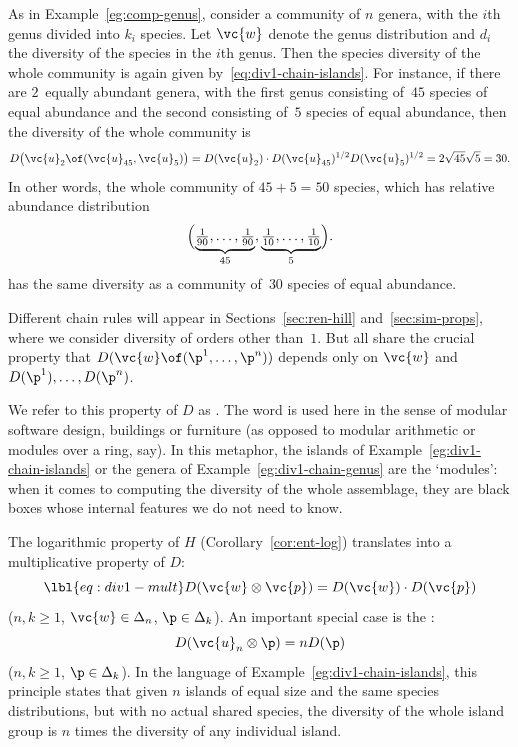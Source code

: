 \begin{example}
% 
As in Example~\ref{eg:comp-genus}, consider a community of $n$ genera, with
the $i$th genus divided into $k_i$ species.  Let $\vc{w}$ denote the genus
distribution and $d_i$ the diversity of the species in the $i$th genus.
Then the species diversity of the whole community is again given
by~\eqref{eq:div1-chain-islands}.  For instance, if there are $2$~equally
abundant genera, with the first genus consisting of~$45$ species of equal
abundance and the second consisting of~$5$ species of equal abundance, then
the diversity of the whole community is
\[
D\bigl(\vc{u}_2 \of (\vc{u}_{45}, \vc{u}_5)\bigr)
=
D(\vc{u}_2) \cdot D(\vc{u}_{45})^{1/2} D(\vc{u}_5)^{1/2}
=
2 \sqrt{45}\sqrt{5} 
=
30.
\]
In other words, the whole community of $45 + 5 = 50$ species, which has
relative abundance distribution
\[
\Bigl(
\underbrace{\tfrac{1}{90}, \ldots, \tfrac{1}{90}}_{45},
\underbrace{\tfrac{1}{10}, \ldots, \tfrac{1}{10}}_{5}
\Bigr).
\]
has the same diversity as a community of~$30$ species of equal abundance.
\end{example}

Different chain rules will appear in Sections~\ref{sec:ren-hill}
and~\ref{sec:sim-props}, where we consider diversity of orders other
than~$1$.  But all share the crucial property that $D(\vc{w} \of (\p^1,
\ldots, \p^n))$ depends only on $\vc{w}$ and $D(\p^1), \ldots, D(\p^n)$.

We refer to this property of $D$ as
%
%
.  
%
The word is used here in the sense of modular software design, buildings or
furniture (as opposed to modular arithmetic or modules over a ring, say).
In this metaphor, the islands of Example~\ref{eg:div1-chain-islands} or the
genera of Example~\ref{eg:div1-chain-genus} are the `modules': when it
comes to computing the diversity of the whole assemblage, they are black
boxes whose internal features we do not need to know.

The logarithmic property of $H$ (Corollary~\ref{cor:ent-log}) translates
into a multiplicative property of $D$:
% 
\begin{equation}
\lbl{eq:div1-mult}
D(\vc{w} \otimes \vc{p}) = D(\vc{w}) \cdot D(\vc{p})
\end{equation}
% 
($n, k \geq 1$, $\vc{w} \in \Delta_n$, $\p \in \Delta_k$).  An important
special case is the :
\[
D(\vc{u}_n \otimes \p) = n D(\p)
\]
($n, k \geq 1$, $\p \in \Delta_k$).  In the language of
Example~\ref{eg:div1-chain-islands}, this principle states that given $n$
islands of equal size and the same species distributions, but with no
actual shared species, the diversity of the whole island group is $n$ times
the diversity of any individual island.

